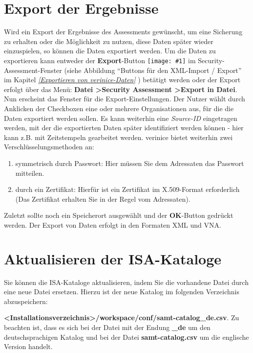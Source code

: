 \documentclass[a4paper,10pt]{book}
\newcommand{\icon}[1]{\texttt{[image: \#1]}}
\begin{document}
\section {Export der Ergebnisse}
Wird ein Export der Ergebnisse des Assessments gewünscht, um eine Sicherung zu erhalten oder die Möglichkeit zu nutzen,
diese Daten später wieder einzuspielen, so können die Daten exportiert werden. Um die Daten zu exportieren kann
entweder der \textbf{Export}-Button \icon{Icon/Export.png} im Security-Assessment-Fenster
(siehe Abbildung ``Buttons für den XML-Import / Export'' im Kapitel {\em \ref{Exportieren von verinice-Daten} }) betätigt
werden oder der Export erfolgt über das Menü: \textbf{Datei \textgreater Security Assessment \textgreater Export in Datei}.
\newline\\
Nun erscheint das Fenster für die Export-Einstellungen. Der Nutzer wählt durch Anklicken der Checkboxen eine oder mehrere Organisationen aus,
für die die Daten exportiert werden sollen. Es kann weiterhin eine \textit{Source-ID} eingetragen werden, mit der die exportierten Daten später
identifiziert werden können - hier kann z.B. mit Zeitstempeln gearbeitet werden. verinice bietet weiterhin zwei Verschlüsselungsmethoden an:
\begin{enumerate}
\item symmetrisch durch Passwort: Hier müssen Sie dem Adressaten das Passwort
mitteilen.
\item durch ein Zertifikat: Hierfür ist ein Zertifikat im X.509-Format
erforderlich (Das Zertifikat erhalten Sie in der Regel vom Adressaten).
\end{enumerate}
Zuletzt sollte noch ein Speicherort ausgewählt und der \textbf{OK}-Button
gedrückt werden. Der Export von Daten erfolgt in den Formaten XML und VNA.

\section{Aktualisieren der ISA-Kataloge}
Sie können die ISA-Kataloge aktualisieren, indem Sie die vorhandene Datei durch eine neue Datei ersetzen.
Hierzu ist der neue Katalog im folgenden Verzeichnis abzuspeichern:

\textbf{\textless Installationsverzeichnis\textgreater/workspace/conf/samt-catalog\_de.csv}.
Zu beachten ist, dass es sich bei der Datei mit der Endung \textbf{\_de} um den deutschsprachigen Katalog und bei der Datei \textbf{samt-catalog.csv}
um die englische Version handelt.
\end{document}
